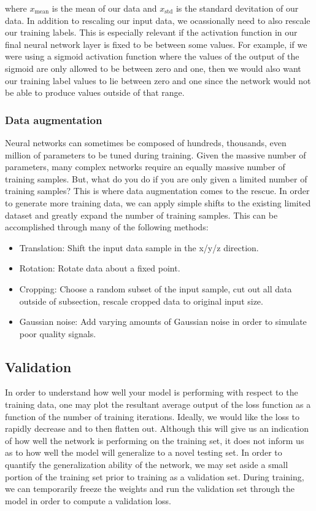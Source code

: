 where $x_{\textrm{mean}}$ is the mean of our data and $x_{\textrm{std}}$ is the standard devitation of our data. In addition to rescaling our input data, we ocassionally need to also rescale our training labels. This is especially relevant if the activation function in our final neural network layer is fixed to be between some values. For example, if we were using a sigmoid activation function where the values of the output of the sigmoid are only allowed to be between zero and one, then we would also want our training label values to lie between zero and one since the network would not be able to produce values outside of that range.

\subsubsection{Data augmentation}

Neural networks can sometimes be composed of hundreds, thousands, even million of parameters to be tuned during training. Given the massive number of parameters, many complex networks require an equally massive number of training samples. But, what do you do if you are only given a limited number of training samples? This is where data augmentation comes to the rescue. In order to generate more training data, we can apply simple shifts to the existing limited dataset and greatly expand the number of training samples. This can be accomplished through many of the following methods:

\begin{itemize}
    \item Translation: Shift the input data sample in the x/y/z direction.
    \item Rotation: Rotate data about a fixed point.
    \item Cropping: Choose a random subset of the input sample, cut out all data outside of subsection, rescale cropped data to original input size.
    \item Gaussian noise: Add varying amounts of Gaussian noise in order to simulate poor quality signals.
\end{itemize}

%
%
\subsection{Validation}
In order to understand how well your model is performing with respect to the training data, one may plot the resultant average output of the loss function as a function of the number of training iterations. Ideally, we would like the loss to rapidly decrease and to then flatten out. Although this will give us an indication of how well the network is performing on the training set, it does not inform us as to how well the model will generalize to a novel testing set. In order to quantify the generalization ability of the network, we may set aside a small portion of the training set prior to training as a validation set. During training, we can temporarily freeze the weights and run the validation set through the model in order to compute a validation loss. 

